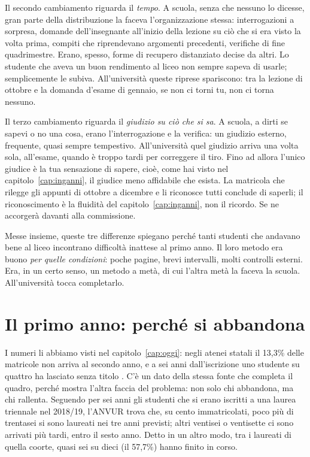 Il secondo cambiamento riguarda il \emph{tempo}. A scuola, senza che
nessuno lo dicesse, gran parte della distribuzione la faceva
l'organizzazione stessa: interrogazioni a sorpresa, domande
dell'insegnante all'inizio della lezione su ciò che si era visto la
volta prima, compiti che riprendevano argomenti precedenti, verifiche
di fine quadrimestre. Erano, spesso, forme di recupero distanziato
decise da altri. Lo studente che aveva un buon rendimento al liceo
non sempre sapeva di usarle; semplicemente le subiva. All'università
queste riprese spariscono: tra la lezione di ottobre e la domanda
d'esame di gennaio, se non ci torni tu, non ci torna nessuno.

Il terzo cambiamento riguarda il \emph{giudizio su ciò che si sa}. A
scuola, a dirti se sapevi o no una cosa, erano l'interrogazione e la
verifica: un giudizio esterno, frequente, quasi sempre tempestivo.
All'università quel giudizio arriva una volta sola, all'esame, quando
è troppo tardi per correggere il tiro. Fino ad allora l'unico giudice è
la tua sensazione di sapere, cioè, come hai visto nel
capitolo~\ref{cap:inganni}, il giudice meno affidabile che esista.
La matricola che rilegge gli appunti di ottobre a dicembre e li
riconosce tutti conclude di saperli; il riconoscimento è la fluidità
del capitolo~\ref{cap:inganni}, non il ricordo. Se ne accorgerà
davanti alla commissione.

Messe insieme, queste tre differenze spiegano perché tanti studenti che
andavano bene al liceo incontrano difficoltà inattese al primo anno. Il
loro metodo era buono \emph{per quelle condizioni}: poche pagine, brevi
intervalli, molti controlli esterni. Era, in un certo senso, un metodo
a metà, di cui l'altra metà la faceva la scuola. All'università tocca
completarlo.

\section{Il primo anno: perché si abbandona}

I numeri li abbiamo visti nel capitolo~\ref{cap:oggi}: negli atenei
statali il 13,3\% delle matricole non arriva al secondo anno, e a sei
anni dall'iscrizione uno studente su quattro ha lasciato senza titolo
\parencite{anvur2026}. C'è un dato della stessa fonte che completa il
quadro, perché mostra l'altra faccia del problema: non solo chi
abbandona, ma chi rallenta. Seguendo per sei anni gli studenti che si
erano iscritti a una laurea triennale nel 2018/19, l'ANVUR trova che,
su cento immatricolati, poco più di trentasei si sono laureati nei tre
anni previsti; altri ventisei o ventisette ci sono arrivati più tardi,
entro il sesto anno. Detto in un altro modo, tra i laureati di quella
coorte, quasi sei su dieci (il 57,7\%) hanno finito in corso.

